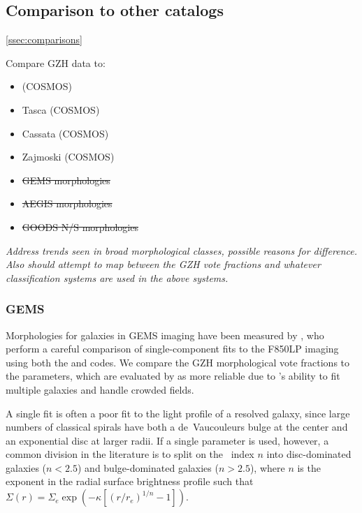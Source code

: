 \documentclass[twocolumn]{aastex6}
\begin{document}
\subsection{Comparison to other catalogs}\ref{ssec:comparisons}

Compare GZH data to:

\begin{itemize}
    \item \citet[ZEST;][]{sca07} (COSMOS)
    \item Tasca (COSMOS)
    \item Cassata (COSMOS)
    \item Zajmoski (COSMOS)
    \item \sout{GEMS morphologies} \citep{hau07}
    \item \sout{AEGIS morphologies} \citep{lot08}
    \item \sout{GOODS N/S morphologies} \citep{bun05}
\end{itemize}

{\note \textit{Address trends seen in broad morphological classes, possible reasons for difference. Also should attempt to map between the GZH vote fractions and whatever classification systems are used in the above systems.}}

\subsubsection{GEMS}

Morphologies for galaxies in GEMS imaging have been measured by \citet{hau07}, who perform a careful comparison of single-component \sersic{} fits to the F850LP imaging using both the \galfit{} and \gimtwod{} codes. We compare the GZH morphological vote fractions to the \galfit{} parameters, which are evaluated by \citet{hau07} as more reliable due to \galfit's ability to fit multiple galaxies and handle crowded fields. 

A single \sersic{} fit is often a poor fit to the light profile of a resolved galaxy, since large numbers of classical spirals have both a de~Vaucouleurs bulge at the center and an exponential disc at larger radii. If a single parameter is used, however, a common division in the literature is to split on the \sersic~index $n$ into disc-dominated galaxies ($n<2.5$) and bulge-dominated galaxies ($n>2.5$), where $n$ is the exponent in the radial surface brightness profile such that $\Sigma(r)=\Sigma_e \exp{\left(-\kappa[(r/r_e)^{1/n} - 1]\right)}$. 
\end{document}
